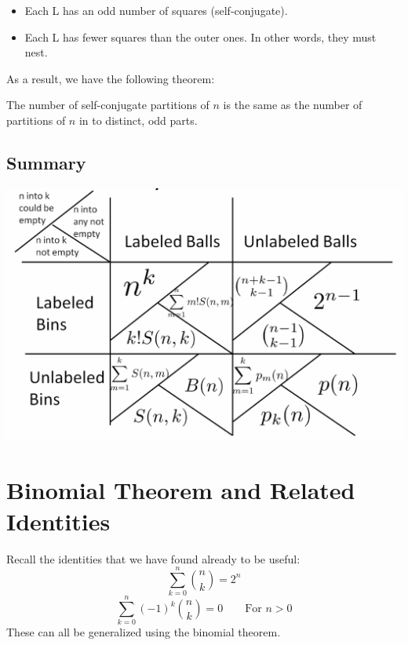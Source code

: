 \documentclass[letterpaper]{article}
\begin{document}
\begin{itemize}
    \item Each L has an odd number of squares (self-conjugate).
    \item Each L has fewer squares than the outer ones. In other words, they must nest. 
\end{itemize}
As a result, we have the following theorem: 
\begin{theorem}{}{}
    The number of self-conjugate partitions of $n$ is the same as the number of partitions of $n$ in to distinct, odd parts. 
\end{theorem}

\subsection{Summary}
\begin{center}
    \includegraphics[scale=0.6]{img/summary_ballbin.PNG}
\end{center}






\newpage 
\section{Binomial Theorem and Related Identities}
Recall the identities that we have found already to be useful:
\[\sum_{k = 0}^n \binom{n}{k} = 2^n\]
\[\sum_{k = 0}^n (-1)^k \binom{n}{k} = 0 \qquad \text{For } n > 0\]
These can all be generalized using the binomial theorem.
\end{document}
